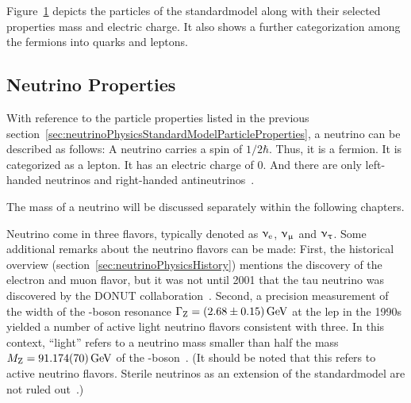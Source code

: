 Figure~\ref{fig:standardmodel} depicts the particles of the \gls{standardmodel} along with their selected properties mass and electric charge. It also shows a further categorization among the fermions into quarks and leptons.
\FloatBarrier
\begin{figure}[t]
	\begin{center}
		\def\svgwidth{\linewidth}
	\end{center}
	\label{fig:standardmodel}
\end{figure}

\subsection{Neutrino Properties}
\label{sec:neutrinoPhysicsStandardModelNeutrinos}
With reference to the particle properties listed in the previous section~\ref{sec:neutrinoPhysicsStandardModelParticleProperties}, a neutrino can be described as follows: A neutrino carries a spin of $1/2 \hbar$. Thus, it is a fermion. It is categorized as a lepton. It has an electric charge of 0. And there are only left-handed neutrinos and right-handed antineutrinos~\cite{Wouter2019}. 

The mass of a neutrino will be discussed separately within the following chapters. 

Neutrino come in three flavors, typically denoted as $\upnu_\mathrm{e}$, $\upnu_\upmu$ and $\upnu_\uptau$. Some additional remarks about the neutrino flavors can be made: First, the historical overview (section~\ref{sec:neutrinoPhysicsHistory}) mentions the discovery of the electron and muon flavor, but it was not until 2001 that the tau neutrino was discovered by the DONUT collaboration~\cite{Kodama2000}. Second, a precision measurement of the width of the -boson resonance $\Gamma_\mathrm{Z}=\SI[separate-uncertainty=true]{2.68\pm0.15}{GeV}$ at the \gls{lep} in the 1990s yielded a number of active light neutrino flavors consistent with three. In this context, ``light'' refers to a neutrino mass smaller than half the mass $M_\mathrm{Z}=\SI{91.174\pm0.070}{GeV}$ of the -boson~\cite{NumberOfNeutrinos}. (It should be noted that this refers to active neutrino flavors. Sterile neutrinos as an extension of the \gls{standardmodel} are not ruled out~\cite{Otten:2008zz}.)

